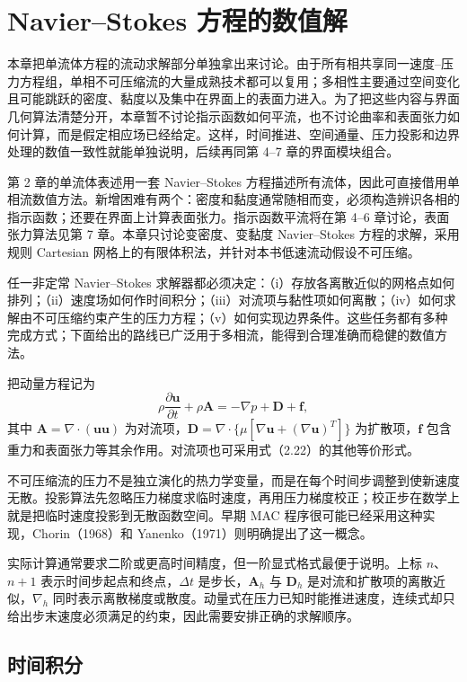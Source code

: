 \documentclass[11pt,a4paper,openany,fontset=none]{ctexbook}
\begin{document}
\chapter{Navier--Stokes 方程的数值解}

本章把单流体方程的流动求解部分单独拿出来讨论。由于所有相共享同一速度--压力方程组，单相不可压缩流的大量成熟技术都可以复用；多相性主要通过空间变化且可能跳跃的密度、黏度以及集中在界面上的表面力进入。为了把这些内容与界面几何算法清楚分开，本章暂不讨论指示函数如何平流，也不讨论曲率和表面张力如何计算，而是假定相应场已经给定。这样，时间推进、空间通量、压力投影和边界处理的数值一致性就能单独说明，后续再同第 4--7 章的界面模块组合。

第 2 章的单流体表述用一套 Navier--Stokes 方程描述所有流体，因此可直接借用单相流数值方法。新增困难有两个：密度和黏度通常随相而变，必须构造辨识各相的指示函数；还要在界面上计算表面张力。指示函数平流将在第 4--6 章讨论，表面张力算法见第 7 章。本章只讨论变密度、变黏度 Navier--Stokes 方程的求解，采用规则 Cartesian 网格上的有限体积法，并针对本书低速流动假设不可压缩。

任一非定常 Navier--Stokes 求解器都必须决定：（i）存放各离散近似的网格点如何排列；（ii）速度场如何作时间积分；（iii）对流项与黏性项如何离散；（iv）如何求解由不可压缩约束产生的压力方程；（v）如何实现边界条件。这些任务都有多种完成方式；下面给出的路线已广泛用于多相流，能得到合理准确而稳健的数值方法。

把动量方程记为
\begin{equation}
 \rho\frac{\partial\bm u}{\partial t}+\rho\bm A=-\nabla p+\bm D+\bm f, \tag{3.1}
\end{equation}
其中 $\bm A=\nabla\cdot(\bm u\bm u)$ 为对流项，$\bm D=\nabla\cdot\{\mu[\nabla\bm u+(\nabla\bm u)^T]\}$ 为扩散项，$\bm f$ 包含重力和表面张力等其余作用。对流项也可采用式（2.22）的其他等价形式。

不可压缩流的压力不是独立演化的热力学变量，而是在每个时间步调整到使新速度无散。投影算法先忽略压力梯度求临时速度，再用压力梯度校正；校正步在数学上就是把临时速度投影到无散函数空间。早期 MAC 程序很可能已经采用这种实现，Chorin（1968）和 Yanenko（1971）则明确提出了这一概念。

实际计算通常要求二阶或更高时间精度，但一阶显式格式最便于说明。上标 $n$、$n+1$ 表示时间步起点和终点，$\Delta t$ 是步长，$\bm A_h$ 与 $\bm D_h$ 是对流和扩散项的离散近似，$\nabla_h$ 同时表示离散梯度或散度。动量式在压力已知时能推进速度，连续式却只给出步末速度必须满足的约束，因此需要安排正确的求解顺序。

\section{时间积分}
\end{document}
